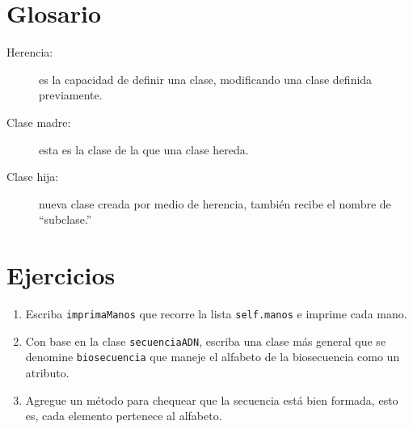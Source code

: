 \section{Glosario}

\begin{description}

\item[Herencia:] es la capacidad de definir una clase, modificando 
una clase definida previamente.

\item[Clase madre:] esta es la clase de la que una clase hereda.

\item[Clase hija:] nueva clase creada por medio de herencia,
también recibe el nombre de ``subclase.''


\end{description}

\section{Ejercicios}
\begin{enumerate}

\item Escriba \texttt{imprimaManos} que recorre
la lista \texttt{self.manos} e imprime cada mano.

\item Con base en la clase \texttt{secuenciaADN}, escriba una 
clase más general que se denomine \texttt{biosecuencia} que maneje el 
alfabeto de la biosecuencia como un atributo.

\item Agregue un método para chequear que la secuencia está 
bien formada, esto es, cada elemento pertenece al alfabeto.


\end{enumerate}